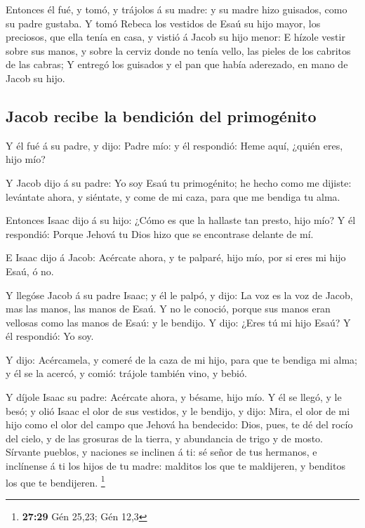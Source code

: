  Entonces él fué, y tomó, y trájolos á su madre: y su madre
hizo guisados, como su padre gustaba.  Y tomó Rebeca los
vestidos de Esaú su hijo mayor, los preciosos, que ella tenía en casa, y
vistió á Jacob su hijo menor:  E hízole vestir sobre sus
manos, y sobre la cerviz donde no tenía vello, las pieles de los
cabritos de las cabras;  Y entregó los guisados y el pan
que había aderezado, en mano de Jacob su hijo.

\hypertarget{jacob-recibe-la-bendiciuxf3n-del-primoguxe9nito}{%
\subsection{Jacob recibe la bendición del
primogénito}\label{jacob-recibe-la-bendiciuxf3n-del-primoguxe9nito}}

 Y él fué á su padre, y dijo: Padre mío: y él respondió:
Heme aquí, ¿quién eres, hijo mío?

 Y Jacob dijo á su padre: Yo soy Esaú tu primogénito; he
hecho como me dijiste: levántate ahora, y siéntate, y come de mi caza,
para que me bendiga tu alma.

 Entonces Isaac dijo á su hijo: ¿Cómo es que la hallaste
tan presto, hijo mío? Y él respondió: Porque Jehová tu Dios hizo que se
encontrase delante de mí.

 E Isaac dijo á Jacob: Acércate ahora, y te palparé, hijo
mío, por si eres mi hijo Esaú, ó no.

 Y llegóse Jacob á su padre Isaac; y él le palpó, y dijo:
La voz es la voz de Jacob, mas las manos, las manos de Esaú.
 Y no le conoció, porque sus manos eran vellosas como las
manos de Esaú: y le bendijo.  Y dijo: ¿Eres tú mi hijo
Esaú? Y él respondió: Yo soy.

 Y dijo: Acércamela, y comeré de la caza de mi hijo, para
que te bendiga mi alma; y él se la acercó, y comió: trájole también
vino, y bebió.

 Y díjole Isaac su padre: Acércate ahora, y bésame, hijo
mío.  Y él se llegó, y le besó; y olió Isaac el olor de sus
vestidos, y le bendijo, y dijo: Mira, el olor de mi hijo como el olor
del campo que Jehová ha bendecido:  Dios, pues, te dé del
rocío del cielo, y de las grosuras de la tierra, y abundancia de trigo y
de mosto.  Sírvante pueblos, y naciones se inclinen á ti:
sé señor de tus hermanos, e inclínense á ti los hijos de tu madre:
malditos los que te maldijeren, y benditos los que te bendijeren.
\footnote{\textbf{27:29} Gén 25,23; Gén 12,3}

